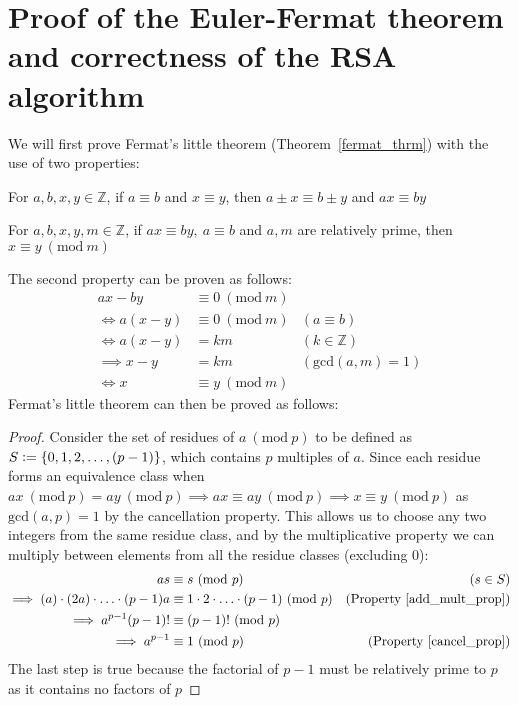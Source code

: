 \section{Proof of the Euler-Fermat theorem and correctness of the RSA algorithm}
We will first prove Fermat's little theorem (Theorem~\ref{fermat_thrm}) with the use of two properties:
\begin{property}
\label{add_mult_prop}
For $a,b,x,y \in \mathbb{Z}$, if $a \equiv b$ and $x \equiv y$, then $a \pm x \equiv b \pm y$ and $ax \equiv by$
\end{property}
\begin{property}[Cancellation]
\label{cancel_prop}
For $a,b,x,y,m \in \mathbb{Z}$, if $ax \equiv by, \ a \equiv b$ and $a, m$ are relatively prime, then $x \equiv y~(\text{mod}~m)$
\end{property}
The second property can be proven as follows:
\begin{align*}
ax - by &\equiv 0~(\text{mod}~m) \\
\iff a(x - y) &\equiv 0~(\text{mod}~m) & (a \equiv b)\\
\iff a(x - y) &= km & (k \in \mathbb{Z}) \\
\implies x - y &= km & (\text{gcd}(a, m) = 1)\\
\iff x &\equiv y~(\text{mod}~m)
\end{align*}
Fermat's little theorem can then be proved as follows:
\begin{proof}
Consider the set of residues of $a~(\text{mod}~p)$ to be defined as\\
$S \vcentcolon= \{0, 1, 2, \ldots, (p-1) \}$, which contains $p$ multiples of $a$. Since each residue forms an equivalence class when $ax~(\text{mod}~p) = ay~(\text{mod}~p) \implies ax \equiv ay~(\text{mod}~p) \implies x \equiv y~(\text{mod}~p)$ as $\text{gcd}(a,p) = 1$ by the cancellation property. This allows us to choose any two integers from the same residue class, and by the multiplicative property we can multiply between elements from all the residue classes (excluding 0):
\begin{align*}
as &\equiv s~(\text{mod}~p) & (s \in S)\\
\implies (a) \cdot (2a) \cdot \ldots \cdot (p - 1)a &\equiv 1 \cdot 2 \cdot \ldots \cdot (p - 1)~(\text{mod}~p) & (\text{Property}~\ref{add_mult_prop}) \\
\implies a^{p - 1} (p - 1)! &\equiv (p - 1)!~(\text{mod}~p) \\
\implies a^{p - 1} &\equiv 1~(\text{mod}~p) & (\text{Property}~\ref{cancel_prop})
\end{align*}
The last step is true because the factorial of $p - 1$ must be relatively prime to $p$ as it contains no factors of $p$
\end{proof}
